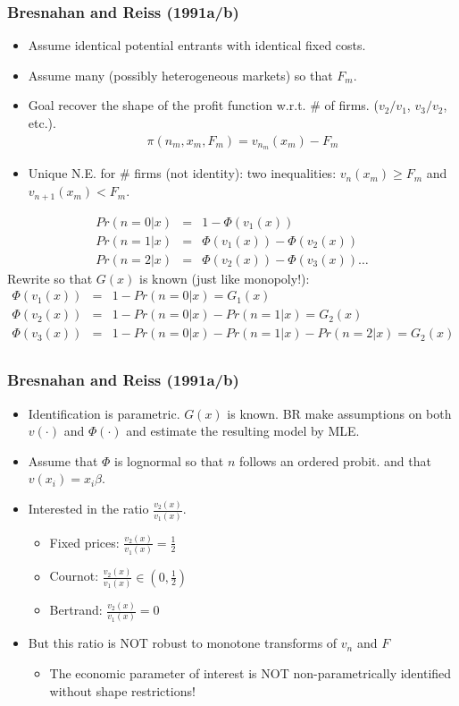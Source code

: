 \documentclass[xcolor=pdftex,dvipsnames,table,mathserif]{beamer}
\begin{document}
\begin{frame}
\frametitle{Bresnahan and Reiss (1991a/b)}
\small
\begin{itemize}
\item Assume identical potential entrants with identical fixed costs.
\item Assume many (possibly heterogeneous markets) so that $F_m$.
\item Goal recover the shape of the profit function w.r.t. \# of firms. ($v_2/v_1$, $v_3/v_2$, etc.).
\begin{eqnarray*}
\pi(n_m, x_m, F_m) = v_{n_m} (x_m) - F_m
\end{eqnarray*}
\item Unique N.E. for \# firms (not identity): two inequalities: $v_{n}(x_m) \geq F_m$ and $v_{n+1}(x_m) < F_m$.
\end{itemize}
\begin{eqnarray*}
Pr(n=0 | x) &=& 1- \Phi(v_1(x))\\
Pr(n=1 | x) &=& \Phi(v_1(x))-\Phi(v_2(x))  \\
Pr(n=2 | x) &=& \Phi(v_2(x))-\Phi(v_3(x))  \ldots
\end{eqnarray*}
Rewrite so that $G(x)$ is known (just like monopoly!):
\begin{eqnarray*}
 \Phi(v_1(x)) &=& 1- Pr(n=0 | x) = G_1(x)\\
 \Phi(v_2(x)) &=& 1- Pr(n=0 | x)  - Pr(n=1 | x) = G_2(x)\\
 \Phi(v_3(x)) &=& 1- Pr(n=0 | x)  - Pr(n=1 | x) - Pr(n=2 | x) = G_2(x)\\
\end{eqnarray*}
\end{frame}

\begin{frame}
\frametitle{Bresnahan and Reiss (1991a/b)}
\small
\begin{itemize}
\item Identification is parametric. $G(x)$ is known. BR make assumptions on both $v(\cdot)$ and $\Phi(\cdot)$ and estimate the resulting model by MLE.
\item Assume that $\Phi$ is lognormal so that $n$ follows an ordered probit. and that $v(x_i) = x_i \beta$.
\item Interested in the ratio $\frac{v_2(x)}{v_1(x)}$.
\begin{itemize}
\item Fixed prices: $\frac{v_2(x)}{v_1(x)} = \frac{1}{2}$
\item Cournot: $\frac{v_2(x)}{v_1(x)} \in (0, \frac{1}{2})$
\item Bertrand: $\frac{v_2(x)}{v_1(x)} =0$
\end{itemize}
\item But this ratio is NOT robust to monotone transforms of $v_n$ and $F$
\begin{itemize}
\item The economic parameter of interest is NOT non-parametrically identified without shape restrictions!
\end{itemize}
\end{itemize}
\end{frame}
\end{document}
